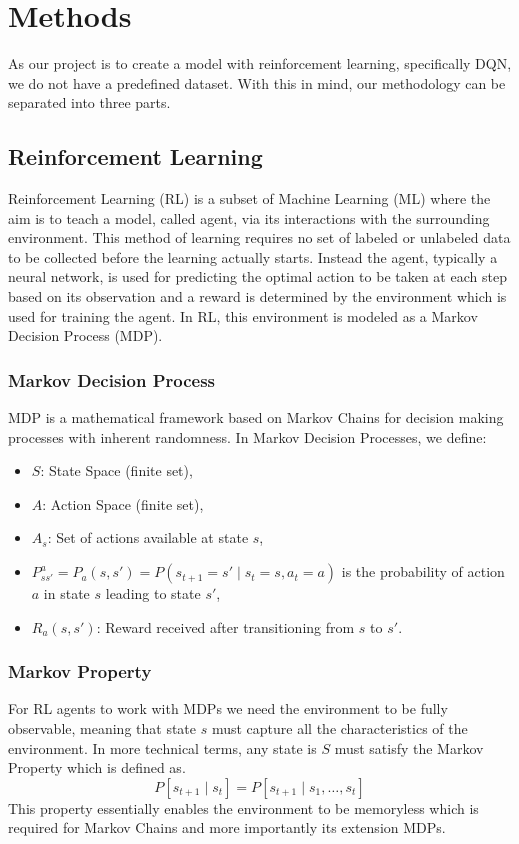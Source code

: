 \section{Methods}
As our project is to create a model with reinforcement learning, specifically DQN,
we do not have a predefined dataset. With this in mind, our methodology can be separated
into three parts.

\subsection{Reinforcement Learning}
Reinforcement Learning (RL) is a subset of Machine Learning (ML) where the
aim is to teach a model, called agent, via its interactions with the surrounding environment.
This method of learning requires no set of labeled or unlabeled data to be collected before
the learning actually starts. Instead the agent, typically a neural network,
is used for predicting the optimal action to be taken at each step based on its observation
and a reward is determined by the environment which is used for training the agent.
In RL, this environment is modeled as a Markov Decision Process (MDP).

\subsubsection{Markov Decision Process}
MDP is a mathematical framework based on Markov Chains for decision making processes
with inherent randomness. In Markov Decision Processes, we define:
\begin{itemize}
    \item \(S\): State Space (finite set),
    \item \(A\): Action Space (finite set),
    \item \(A_s\): Set of actions available at state \(s\),
    \item
          \(P^a_{ss'} = P_a(s,s') = P(s_{t+1} = s' \;|\; s_t = s, a_t = a)\) is the probability of action \(a\) in state \(s\) leading to state \(s'\),
    \item \(R_a(s, s')\): Reward received after transitioning from \(s\) to \(s'\).
\end{itemize}

\subsubsection{Markov Property}
For RL agents to work with MDPs we need the environment to be fully observable,
meaning that state \(s\) must capture all the characteristics of the environment.
In more technical terms, any state is \(S\) must satisfy the Markov Property which is defined as.
\begin{equation}
    P[s_{t+1} \;|\; s_t] = P[s_{t+1} \;|\; s_1, \ldots, s_t]
\end{equation}
This property essentially enables the environment to be memoryless which is required for
Markov Chains and more importantly its extension MDPs.

